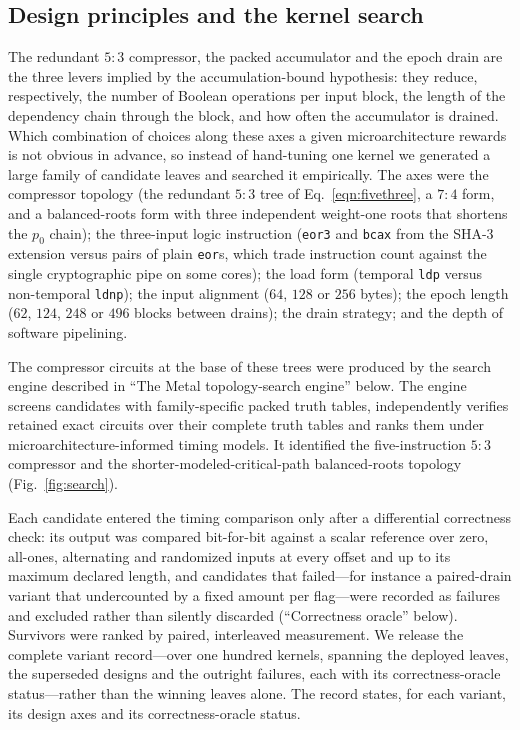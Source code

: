\documentclass[fleqn,10pt]{wlscirep}
\begin{document}
\subsection*{Design principles and the kernel search}
The redundant $5{:}3$ compressor, the packed accumulator and the epoch drain are the three levers implied by the accumulation-bound hypothesis: they reduce, respectively, the number of Boolean operations per input block, the length of the dependency chain through the block, and how often the accumulator is drained. Which combination of choices along these axes a given microarchitecture rewards is not obvious in advance, so instead of hand-tuning one kernel we generated a large family of candidate leaves and searched it empirically. The axes were the compressor topology (the redundant $5{:}3$ tree of Eq.~\ref{eqn:fivethree}, a $7{:}4$ form, and a balanced-roots form with three independent weight-one roots that shortens the $p_0$ chain); the three-input logic instruction (\texttt{eor3} and \texttt{bcax} from the SHA-3 extension versus pairs of plain \texttt{eor}s, which trade instruction count against the single cryptographic pipe on some cores); the load form (temporal \texttt{ldp} versus non-temporal \texttt{ldnp}); the input alignment ($64$, $128$ or $256$ bytes); the epoch length ($62$, $124$, $248$ or $496$ blocks between drains); the drain strategy; and the depth of software pipelining.

The compressor circuits at the base of these trees were produced by the search engine described in ``The Metal topology-search engine'' below. The engine screens candidates with family-specific packed truth tables, independently verifies retained exact circuits over their complete truth tables and ranks them under microarchitecture-informed timing models. It identified the five-instruction $5{:}3$ compressor and the shorter-modeled-critical-path balanced-roots topology (Fig.~\ref{fig:search}).

Each candidate entered the timing comparison only after a differential correctness check: its output was compared bit-for-bit against a scalar reference over zero, all-ones, alternating and randomized inputs at every offset and up to its maximum declared length, and candidates that failed---for instance a paired-drain variant that undercounted by a fixed amount per flag---were recorded as failures and excluded rather than silently discarded (``Correctness oracle'' below). Survivors were ranked by paired, interleaved measurement. We release the complete variant record---over one hundred kernels, spanning the deployed leaves, the superseded designs and the outright failures, each with its correctness-oracle status---rather than the winning leaves alone. The record states, for each variant, its design axes and its correctness-oracle status.
\end{document}
